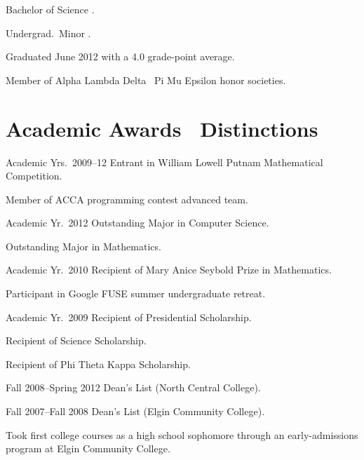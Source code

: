 \documentclass{bcatresume}
\begin{document}
  \maketitle

  \begin{topic}
    \item[Bachelor of Science] .

    \item[Undergrad.\ Minor] .

    \item Graduated June 2012 with a 4.0 grade-point average.

    Member of Alpha Lambda Delta \amp\ Pi Mu Epsilon honor societies.
  \end{topic}

  \section{Academic Awards \amp\ Distinctions}

  \begin{topic}
    \item[Academic Yrs.\ 2009--12] Entrant in William Lowell Putnam Mathematical Competition.

    Member of ACCA programming contest advanced team.

    \item[Academic Yr.\ 2012] Outstanding Major in Computer Science.

      Outstanding Major in Mathematics.

    \item[Academic Yr.\ 2010] Recipient of Mary Anice Seybold Prize in Mathematics.

    Participant in Google FUSE summer undergraduate retreat.

    \item[Academic Yr.\ 2009] Recipient of Presidential Scholarship.

    Recipient of Science Scholarship.

    Recipient of Phi Theta Kappa Scholarship.

    \item[Fall 2008--Spring 2012] Dean's List (North Central College).

    \item[Fall 2007--Fall 2008] Dean's List (Elgin Community College).

    \item Took first college courses as a high school sophomore through an early-admissions program at Elgin Community College.
  \end{topic}
\end{document}
